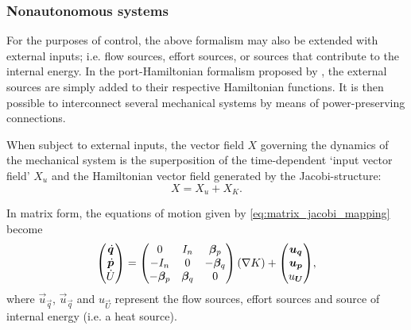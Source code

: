 \subsubsection{Nonautonomous systems}
For the purposes of control, the above formalism may also be extended with external inputs; i.e. flow sources, effort sources, or sources that contribute to the internal energy. In the port-Hamiltonian formalism proposed by \citet{VanDerSchaft2006}, the external sources are simply added to their respective Hamiltonian functions. It is then possible to interconnect several mechanical systems by means of power-preserving connections.

When subject to external inputs, the vector field \(X\) governing the dynamics of the mechanical system is the superposition of the time-dependent `input vector field' \(X_u\) and the Hamiltonian vector field generated by the Jacobi-structure:
\begin{equation}
    X = X_u + X_K.
\end{equation}

In matrix form, the equations of motion given by \cref{eq:matrix_jacobi_mapping} become
\begin{equation}
    \mqty(\dot{\vec{q}} \\ \dot{\vec{p}} \\ \dot{U}) = \mqty( 0 & I_n & \vec{\beta}_p \\  -I_n & 0 & -\vec{\beta}_q \\ -\vec{\beta}_p & \vec{\beta}_q & 0)\,(\nabla K)
    + \mqty(\vec{u}_\vec{q} \\\vec{u}_\vec{p} \\ u_\vec{U}),
\end{equation}
where \(\vec{u}_\vec{q}\), \(\vec{u}_\vec{q}\) and \(u_\vec{U}\) represent the flow sources, effort sources and source of internal energy (i.e. a heat source).




